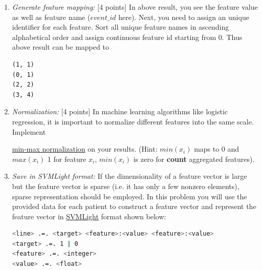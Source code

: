 \documentclass[12pt]{article}
\begin{document}
\begin{enumerate}
\item \emph{Generate feature mapping:} [4 points]
In above result, you see the feature value as well as feature name ($event\_id$ here). Next, you need to assign an unique identifier for each feature. Sort all unique feature names in ascending alphabetical order and assign continuous feature id starting from 0. Thus above result can be mapped to

\begin{lstlisting}[frame=single]
(1, 1)
(0, 1)
(2, 2)
(3, 4)
\end{lstlisting}

\item \emph{Normalization:} [4 points] In machine learning algorithms like logistic regression, it is important to normalize different features into the same scale. Implement 
 
\href{http://stats.stackexchange.com/questions/70801/how-to-normalize-data-to-0-1-range}{min-max normalization} on your results. (Hint: $min(x_i)$ maps to 0 and $max(x_i)$ 1 for feature $x_i$, $min(x_i)$ is zero for \textbf{count} aggregated features).

\item \emph{Save in  SVMLight format:} If the dimensionality of a feature vector is large but the feature vector is sparse (i.e. it has only a few nonzero elements), sparse representation should be employed. In this problem you will use the provided data for each patient to construct a feature vector and represent the feature vector in \href{http://svmlight.joachims.org/}{SVMLight} format shown below: \\

\begin{lstlisting}[frame=single, language=bash]
<line> .=. <target> <feature>:<value> <feature>:<value> 
<target> .=. 1 | 0
<feature> .=. <integer>
<value> .=. <float>
\end{lstlisting}


\end{enumerate}
\end{document}
